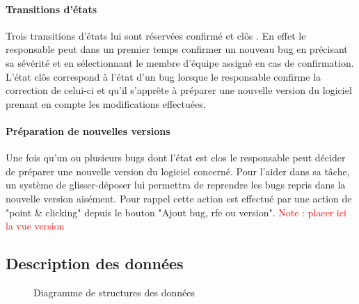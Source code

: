 \documentclass{article}[12pt]
\begin{document}
\paragraph{Transitions d'états}
Trois transitions d'états lui sont réservées \og confirmé \fg et \og clôs \fg . En effet le responsable peut dans un premier temps confirmer un nouveau bug en précisant sa sévérité et en sélectionnant le membre d'équipe assigné en cas de confirmation. L'état \og clôs \fg correspond à l'état d'un bug lorsque le responsable confirme la correction de celui-ci et qu'il s'apprête à préparer une nouvelle version du logiciel prenant en compte les modifications effectuées.

\paragraph{Préparation de nouvelles versions}
Une fois qu'un ou plusieurs bugs dont l'état est \og clos \fg le responsable peut décider de préparer une nouvelle version du logiciel concerné. Pour l'aider dans sa tâche, un  système de glisser-déposer lui permettra de reprendre les bugs repris dans la nouvelle version aisément. Pour rappel cette action est effectué par une action de "point \& clicking" depuis le bouton "Ajout bug, rfe ou version".
  \textcolor{red}{Note : placer ici la vue version}


\subsection{Description des données}
\begin{figure}[H]
	\centering
	\caption{Diagramme de structures des données}
\end{figure}
\end{document}
